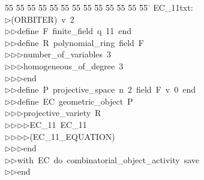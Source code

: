 %
%
\begin{tabbing}
55 \= 55 \= 55 \= 55 \= 55 \= 55 \= 55 \= 55 \= 55 \= 55 \= 55 \= 55 \= 55 \= \kill
EC\_11txt:\\[0pt]
$\triangleright$\>(ORBITER)\ v\ 2\ \\[0pt]
$\triangleright$\>$\triangleright$\>define\ F\ finite\_field\ q\ 11\ end\ \\[0pt]
$\triangleright$\>$\triangleright$\>define\ R\ polynomial\_ring\ field\ F\ \\[0pt]
$\triangleright$\>$\triangleright$\>$\triangleright$\>number\_of\_variables\ 3\ \\[0pt]
$\triangleright$\>$\triangleright$\>$\triangleright$\>homogeneous\_of\_degree\ 3\ \\[0pt]
$\triangleright$\>$\triangleright$\>$\triangleright$\>end\ \\[0pt]
$\triangleright$\>$\triangleright$\>define\ P\ projective\_space\ n\ 2\ field\ F\ v\ 0\ end\ \\[0pt]
$\triangleright$\>$\triangleright$\>define\ EC\ geometric\_object\ P\ \\[0pt]
$\triangleright$\>$\triangleright$\>$\triangleright$\>projective\_variety\ R\ \\[0pt]
$\triangleright$\>$\triangleright$\>$\triangleright$\>$\triangleright$\>EC\_11\ EC\_11\ \\[0pt]
$\triangleright$\>$\triangleright$\>$\triangleright$\>$\triangleright$\>(EC\_11\_EQUATION)\ \\[0pt]
$\triangleright$\>$\triangleright$\>$\triangleright$\>end\ \\[0pt]
$\triangleright$\>$\triangleright$\>with\ EC\ do\ combinatorial\_object\_activity\ save\ \\[0pt]
$\triangleright$\>$\triangleright$\>end\\[0pt]
\end{tabbing}
